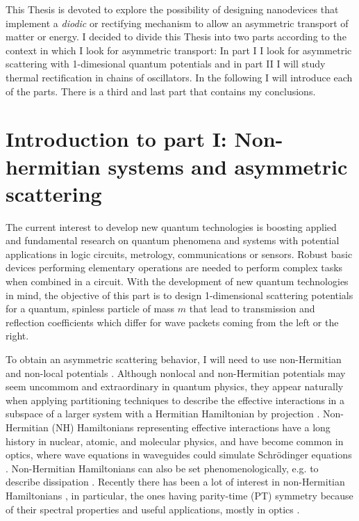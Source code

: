 This Thesis is devoted to explore the possibility of designing nanodevices that implement a \textit{diodic} or rectifying mechanism to allow an asymmetric transport of matter or energy. I decided to divide this Thesis into two parts according to the context in which I look for asymmetric transport: In part I I look for asymmetric scattering with 1-dimesional quantum potentials and in part II I will study thermal rectification in chains of oscillators. In the following I will introduce each of the parts. There is a third and last part that contains my conclusions.


\section*{Introduction to part I: Non-hermitian systems and asymmetric scattering}

The current interest to develop new quantum technologies is boosting applied
and fundamental research on quantum phenomena and systems with potential
applications in logic circuits, metrology, communications or sensors. Robust basic devices performing elementary operations are needed to perform complex tasks when combined in a circuit. With the development of new quantum technologies in mind, the objective of this part is to design 1-dimensional scattering potentials for a quantum, spinless particle of mass $m$ that lead to transmission and reflection coefficients which differ for wave packets coming from the left or the right.

To obtain an asymmetric scattering behavior, I will need to use non-Hermitian and non-local potentials \cite{Muga2004,Mostafazadeh2018}. Although nonlocal and non-Hermitian potentials may seem uncommom and extraordinary in quantum physics, they appear naturally when applying partitioning techniques to describe the effective interactions in a subspace of a larger system with a Hermitian Hamiltonian by projection \cite{Feshbach1958,Ruschhaupt2004,Muga2004}. Non-Hermitian (NH) Hamiltonians representing effective interactions have a long history in nuclear, atomic, and molecular physics, and have become common in optics, where wave equations in waveguides could simulate  Schr\"odinger equations \cite{Ruschhaupt2005,Longhi2017a,Konotop2016}. Non-Hermitian Hamiltonians can also be set phenomenologically, e.g. to describe dissipation \cite{Ruschhaupt2005}. Recently there has been a lot of interest in non-Hermitian Hamiltonians \cite{Nixon2016,Nixon2016a,Chen2017,Ruschhaupt2017,Simon2018,Simon2019a,Alana2020,Bernard2002,Kawabata2019}, in particular, the ones having parity-time (PT) symmetry \cite{Bender1998,Znojil2015} because of their spectral properties and useful applications, mostly in optics  \cite{Longhi2017a,Konotop2016,Longhi2014}.

